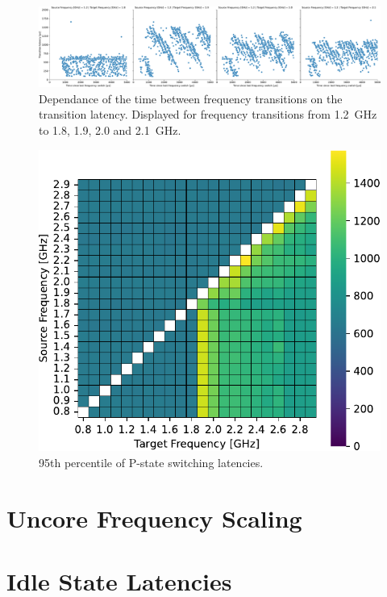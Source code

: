 \begin{figure}[]
    \centering
    \includegraphics[width=\columnwidth]{fig/ftalat_scatter_wait_transition_latency_hati.pdf}
    \caption{\label{fig:pstate_latencies_time_dependance}Dependance of the time between frequency transitions on the transition latency. Displayed for frequency transitions from \SI{1.2}{\GHz} to \SI{1.8}{}, \SI{1.9}{}, \SI{2.0}{} and \SI{2.1}{\GHz}.}
\end{figure}

\begin{figure}[]
    \centering
    \includegraphics[width=0.45\columnwidth]{fig/ftalat_95percentQuantile_hati.pdf}
    \caption{\label{fig:pstate_latencies_95percentQuantile}95th percentile of P-state switching latencies.}
\end{figure}


\section{Uncore Frequency Scaling}

\section{Idle State Latencies}

